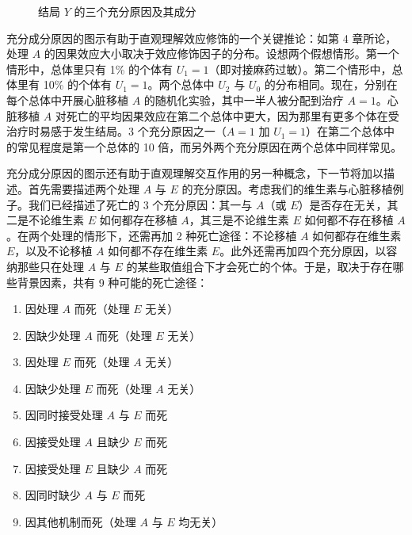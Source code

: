 \begin{figure}[htbp]
\centering
{}
\caption{结局 $Y$ 的三个充分原因及其成分}
\label{fig:5.1}
\end{figure}

充分成分原因的图示有助于直观理解效应修饰的一个关键推论：如第 4 章所论，处理 $A$ 的因果效应大小取决于效应修饰因子的分布。设想两个假想情形。第一个情形中，总体里只有 1\% 的个体有 $U_1=1$（即对接麻药过敏）。第二个情形中，总体里有 10\% 的个体有 $U_1=1$。两个总体中 $U_2$ 与 $U_0$ 的分布相同。现在，分别在每个总体中开展心脏移植 $A$ 的随机化实验，其中一半人被分配到治疗 $A=1$。心脏移植 $A$ 对死亡的平均因果效应在第二个总体中更大，因为那里有更多个体在受治疗时易感于发生结局。3 个充分原因之一（$A=1$ 加 $U_1=1$）在第二个总体中的常见程度是第一个总体的 10 倍，而另外两个充分原因在两个总体中同样常见。

充分成分原因的图示还有助于直观理解交互作用的另一种概念，下一节将加以描述。首先需要描述两个处理 $A$ 与 $E$ 的充分原因。考虑我们的维生素与心脏移植例子。我们已经描述了死亡的 3 个充分原因：其一与 $A$（或 $E$）是否存在无关，其二是不论维生素 $E$ 如何都存在移植 $A$，其三是不论维生素 $E$ 如何都不存在移植 $A$。在两个处理的情形下，还需再加 2 种死亡途径：不论移植 $A$ 如何都存在维生素 $E$，以及不论移植 $A$ 如何都不存在维生素 $E$。此外还需再加四个充分原因，以容纳那些只在处理 $A$ 与 $E$ 的某些取值组合下才会死亡的个体。于是，取决于存在哪些背景因素，共有 9 种可能的死亡途径：

\begin{enumerate}
\item 因处理 $A$ 而死（处理 $E$ 无关）
\item 因缺少处理 $A$ 而死（处理 $E$ 无关）
\item 因处理 $E$ 而死（处理 $A$ 无关）
\item 因缺少处理 $E$ 而死（处理 $A$ 无关）
\item 因同时接受处理 $A$ 与 $E$ 而死
\item 因接受处理 $A$ 且缺少 $E$ 而死
\item 因接受处理 $E$ 且缺少 $A$ 而死
\item 因同时缺少 $A$ 与 $E$ 而死
\item 因其他机制而死（处理 $A$ 与 $E$ 均无关）
\end{enumerate}

